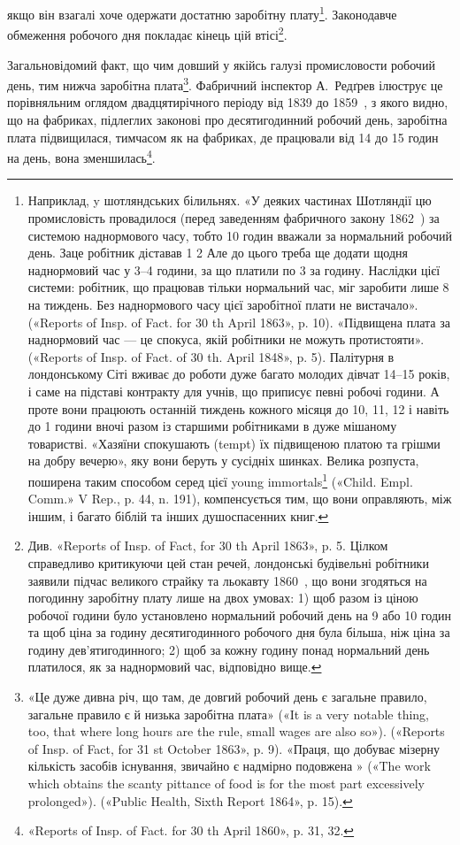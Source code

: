 якщо він взагалі хоче одержати достатню заробітну плату\footnote{
Наприклад, y шотляндських білильнях. «У деяких частинах
Шотляндії цю промисловість провадилося (перед заведенням фабричного
закону 1862~) за системою наднормового часу, тобто 10 годин вважали
за нормальний робочий день. Заце робітник діставав 1 2
Але до цього треба ще додати щодня наднормовий час у 3--4 години,
за що платили по 3 за годину. Наслідки цієї системи: робітник,
що працював тільки нормальний час, міг заробити лише 8 на
тиждень. Без наднормового часу цієї заробітної плати не вистачало».
(«Reports of Insp. of Fact. for 30 th April 1863», p. 10). «Підвищена плата
за наднормовий час — це спокуса, якій робітники не можуть протистояти».
(«Reports of Insp. of Fact. of 30 th. April 1848», p. 5). Палітурня
в лондонському Сіті вживає до роботи дуже багато молодих дівчат
14--15 років, і саме на підставі контракту для учнів, що приписує певні
робочі години. А проте вони працюють останній тиждень кожного місяця
до 10, 11, 12 і навіть до 1 години вночі разом із старшими робітниками
в дуже мішаному товаристві. «Хазяїни спокушають (tempt) їх підвищеною
платою та грішми на добру вечерю», яку вони беруть у сусідніх
шинках. Велика розпуста, поширена таким способом серед цієї
young immortals\footnote*{
безсмертної молоді. \emph{Ред.}
} («Child. Empl. Comm.» V Rep., p. 44, n. 191), компенсується
тим, що вони оправляють, між іншим, і багато біблій та інших
душоспасенних книг.
}.
Законодавче обмеження робочого дня покладає кінець цій втісі\footnote{
Див. «Reports of Insp. of Fact, for 30 th April 1863», p. 5. Цілком
справедливо критикуючи цей стан речей, лондонські будівельні робітники
заявили підчас великого страйку та льокавту 1860~, що вони згодяться
на погодинну заробітну плату лише на двох умовах: 1) щоб разом
із ціною робочої години було установлено нормальний робочий день на
9 або 10 годин та щоб ціна за годину десятигодинного робочого дня була
більша, ніж ціна за годину дев’ятигодинного; 2) щоб за кожну годину
понад нормальний день платилося, як за наднормовий час, відповідно вище.
}.

Загальновідомий факт, що чим довший у якійсь галузі промисловости
робочий день, тим нижча заробітна плата\footnote{
«Це дуже дивна річ, що там, де довгий робочий день є загальне
правило, загальне правило є й низька заробітна плата» («It is a very
notable thing, too, that where long hours are the rule, small wages are also
so»). («Reports of Insp. of Fact, for 31 st October 1863», p. 9). «Праця, що
добуває мізерну кількість засобів існування, звичайно є надмірно подовжена
» («The work which obtains the scanty pittance of food is for the most
part excessively prolonged»). («Public Health, Sixth Report 1864», p. 15).
}. Фабричний
інспектор А.~Редґрев ілюструє це порівняльним оглядом
двадцятирічного періоду від 1839 до 1859~, з якого видно, що
на фабриках, підлеглих законові про десятигодинний робочий
день, заробітна плата підвищилася, тимчасом як на фабриках,
де працювали від 14 до 15 годин на день, вона зменшилась\footnote{
«Reports of Insp. of Fact. for 30 th April 1860», p. 31, 32.
}.

